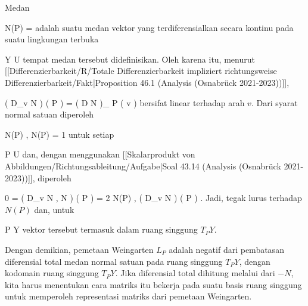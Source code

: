 {

Medan

\mavergleichskette
{\vergleichskette
{ N(P)
}
{ = }{ {  }
}
{  }{
}
{    }{
}
{   }{
}
}
{}{}{}
adalah suatu medan vektor yang terdiferensialkan secara kontinu pada suatu lingkungan terbuka

\mavergleichskette
{\vergleichskette
{ Y
}
{ \subseteq }{ U
}
{  }{
}
{    }{
}
{   }{
}
}
{}{}{}
tempat medan tersebut didefinisikan. Oleh karena itu, menurut
[[Differenzierbarkeit/R/Totale Differenzierbarkeit impliziert richtungsweise Differenzierbarkeit/Fakt|Proposition 46.1 (Analysis (Osnabrück 2021-2023))]],

\mavergleichskettedisp
{\vergleichskette
{ \left(  D_{v}  N   \right) \left(   P  \right)
}
{ =} { \left(  D N   \right)_{ P } \left(  v  \right)
}
{ } {
}
{ } {
}
{ } {
}
}
{}{}{}
bersifat linear terhadap arah $v$. Dari syarat normal satuan diperoleh

\mavergleichskette
{\vergleichskette
{ \left\langle  N(P)  ,  N(P)   \right\rangle
}
{ = }{ 1
}
{  }{
}
{    }{
}
{   }{
}
}
{}{}{}
untuk setiap

\mavergleichskette
{\vergleichskette
{ P
}
{ \in }{ U
}
{  }{
}
{    }{
}
{   }{
}
}
{}{}{}
dan, dengan menggunakan
[[Skalarprodukt von Abbildungen/Richtungsableitung/Aufgabe|Soal 43.14 (Analysis (Osnabrück 2021-2023))]], diperoleh

\mavergleichskettedisp
{\vergleichskette
{ 0
}
{ =} { \left(  D_{v}  \left\langle  N  ,  N  \right\rangle   \right) \left(   P  \right)
}
{ =} { 2 \left\langle  N(P)  ,  \left(  D_{v}  N   \right) \left(   P  \right)   \right\rangle
}
{ } {
}
{ } {
}
}
{}{}{.}
Jadi,
 tegak lurus terhadap $N(P)$ dan, untuk

\mavergleichskette
{\vergleichskette
{ P
}
{ \in }{ Y
}
{  }{
}
{    }{
}
{   }{
}
}
{}{}{}
vektor tersebut termasuk dalam ruang singgung $T_PY$.

}

Dengan demikian, pemetaan Weingarten $L_P$ adalah negatif dari pembatasan diferensial total medan normal satuan pada ruang singgung $T_PY$, dengan kodomain ruang singgung $T_PY$. Jika diferensial total dihitung melalui
dari $-N$, kita harus menentukan cara matriks itu bekerja pada suatu basis ruang singgung untuk memperoleh representasi matriks dari pemetaan Weingarten.

